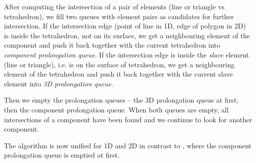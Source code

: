 \documentclass{elsarticle}
\begin{document}
After computing the intersection of a pair of elements (line or triangle vs tetrahedron), we fill
two queues with element pairs as candidates for further intersection. If the intersection edge 
(point of line in 1D, edge of polygon in 2D) is inside the tetrahedron, not on its surface, we
get a neighbouring element of the component and push it back together with the current tetrahedron into 
\emph{component prolongation queue}. If the intersection edge is inside the \emph{slave} element 
(line or triangle), i.e. is on the surface of tetrahedron, we get a neighbouring element of the tetrahedron
and push it back together with the current slave element into \emph{3D prolongation queue}.

Then we empty the prolongation queues -- the 3D prolongation queue at first, then the component prolongation queue.
When both queues are empty, all intersections of a component have been found and we continue to look for
another component.

The algorithm is now unified for 1D and 2D in contrast to \cite{fris_dp_2015}, where the component prolongation
queue is emptied at first.

\end{document}
